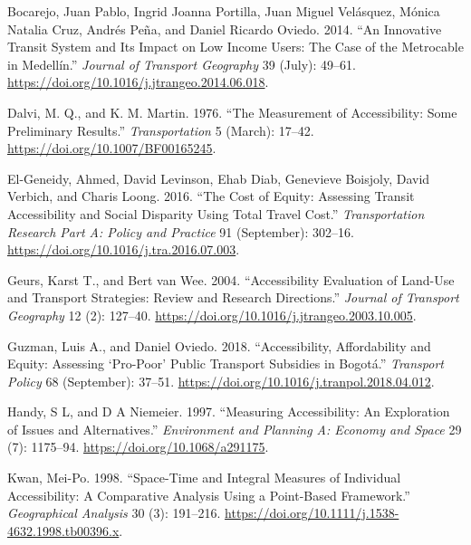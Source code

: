 \documentclass[msc,numbers]{coppe}
\begin{document}
  \hypertarget{refs}{}
  \begin{CSLReferences}{1}{0}
  \leavevmode\hypertarget{ref-bocarejo2014innovative}{}%
  Bocarejo, Juan Pablo, Ingrid Joanna Portilla, Juan Miguel Velásquez, Mónica Natalia Cruz, Andrés Peña, and Daniel Ricardo Oviedo. 2014. {``An Innovative Transit System and Its Impact on Low Income Users: The Case of the {Metrocable} in {Medellín}.''} \emph{Journal of Transport Geography} 39 (July): 49--61. \url{https://doi.org/10.1016/j.jtrangeo.2014.06.018}.

  \leavevmode\hypertarget{ref-dalvi1976measurement}{}%
  Dalvi, M. Q., and K. M. Martin. 1976. {``The Measurement of Accessibility: {Some} Preliminary Results.''} \emph{Transportation} 5 (March): 17--42. \url{https://doi.org/10.1007/BF00165245}.

  \leavevmode\hypertarget{ref-el-geneidy2016cost}{}%
  El-Geneidy, Ahmed, David Levinson, Ehab Diab, Genevieve Boisjoly, David Verbich, and Charis Loong. 2016. {``The Cost of Equity: {Assessing} Transit Accessibility and Social Disparity Using Total Travel Cost.''} \emph{Transportation Research Part A: Policy and Practice} 91 (September): 302--16. \url{https://doi.org/10.1016/j.tra.2016.07.003}.

  \leavevmode\hypertarget{ref-geurs2004accessibility}{}%
  Geurs, Karst T., and Bert van Wee. 2004. {``Accessibility Evaluation of Land-Use and Transport Strategies: Review and Research Directions.''} \emph{Journal of Transport Geography} 12 (2): 127--40. \url{https://doi.org/10.1016/j.jtrangeo.2003.10.005}.

  \leavevmode\hypertarget{ref-guzman2018accessibility}{}%
  Guzman, Luis A., and Daniel Oviedo. 2018. {``Accessibility, Affordability and Equity: {Assessing} {`Pro-Poor'} Public Transport Subsidies in {Bogotá}.''} \emph{Transport Policy} 68 (September): 37--51. \url{https://doi.org/10.1016/j.tranpol.2018.04.012}.

  \leavevmode\hypertarget{ref-handy1997measuring}{}%
  Handy, S L, and D A Niemeier. 1997. {``Measuring {Accessibility}: {An Exploration} of {Issues} and {Alternatives}.''} \emph{Environment and Planning A: Economy and Space} 29 (7): 1175--94. \url{https://doi.org/10.1068/a291175}.

  \leavevmode\hypertarget{ref-kwan1998spacetime}{}%
  Kwan, Mei-Po. 1998. {``Space-{Time} and {Integral Measures} of {Individual Accessibility}: {A Comparative Analysis Using} a {Point}-Based {Framework}.''} \emph{Geographical Analysis} 30 (3): 191--216. \url{https://doi.org/10.1111/j.1538-4632.1998.tb00396.x}.


\end{CSLReferences}
\end{document}
